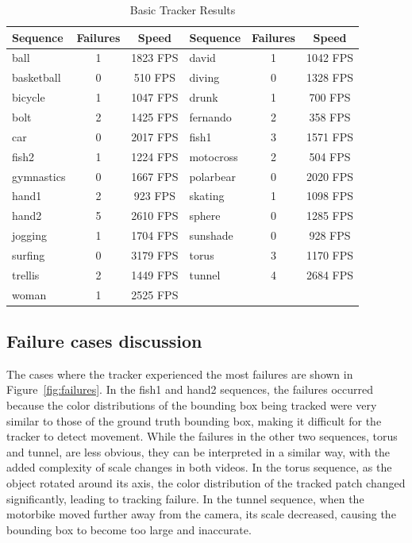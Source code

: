 \documentclass[9pt]{IEEEtran}
\begin{document}
\begin{table}[ht]
  \centering
  \caption{Basic Tracker Results}
  \setlength{\tabcolsep}{3pt}
  \begin{tabular}{l|c|c||l|c|c}
  \hline
  \textbf{Sequence} & \textbf{Failures} & \textbf{Speed} & \textbf{Sequence} & \textbf{Failures} & \textbf{Speed} \\ 
  \hline
  ball       & 1 & 1823 FPS & david     & 1 & 1042 FPS \\ 
  basketball & 0 & 510 FPS  & diving    & 0 & 1328 FPS \\ 
  bicycle    & 1 & 1047 FPS & drunk     & 1 & 700 FPS  \\ 
  bolt       & 2 & 1425 FPS & fernando  & 2 & 358 FPS  \\ 
  car        & 0 & 2017 FPS & fish1     & 3 & 1571 FPS \\ 
  fish2      & 1 & 1224 FPS & motocross & 2 & 504 FPS  \\ 
  gymnastics & 0 & 1667 FPS & polarbear & 0 & 2020 FPS \\ 
  hand1      & 2 & 923 FPS  & skating   & 1 & 1098 FPS \\ 
  hand2      & 5 & 2610 FPS & sphere    & 0 & 1285 FPS \\ 
  jogging    & 1 & 1704 FPS & sunshade  & 0 & 928 FPS  \\ 
  surfing    & 0 & 3179 FPS & torus     & 3 & 1170 FPS \\ 
  trellis    & 2 & 1449 FPS & tunnel    & 4 & 2684 FPS \\ 
  woman      & 1 & 2525 FPS &           &   &          \\ 
  \hline
  \end{tabular}
  \label{tab:basic_tracker_results}
  \end{table}
  
  
  \subsection{Failure cases discussion}
  The cases where the tracker experienced the most failures are shown in 
  Figure~\ref{fig:failures}. In the fish1 and hand2 sequences, the failures 
  occurred because the color distributions of the bounding box being tracked
   were very similar to those of the ground truth bounding box, making it difficult
    for the tracker to detect movement. While the failures in the other two 
    sequences, torus and tunnel, are less obvious, they can be interpreted in a similar way, with the added complexity of scale changes in both videos. In the torus sequence, as the object rotated around its axis, the color distribution of the tracked patch changed significantly, leading to tracking failure. In the tunnel sequence, when the motorbike moved further away from the camera, its scale decreased, causing the bounding box to become too large and inaccurate.
\end{document}
